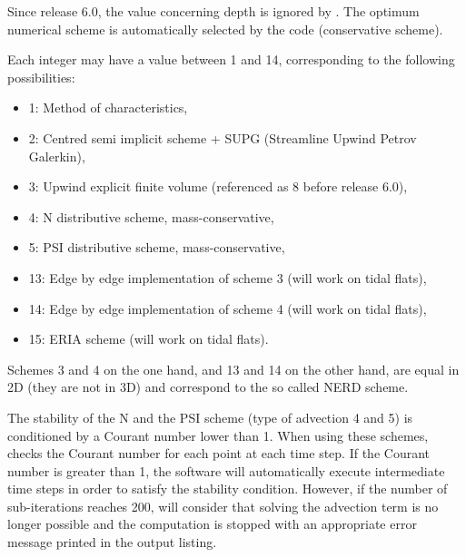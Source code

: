 Since release 6.0, the value concerning depth is ignored by .
The optimum numerical scheme is automatically selected by the code
(conservative scheme).

Each integer may have a value between 1 and 14, corresponding to the following
possibilities:

\begin{itemize}
\item 1: Method of characteristics,

\item 2: Centred semi implicit scheme + SUPG
(Streamline Upwind Petrov Galerkin),

\item 3: Upwind explicit finite volume
(referenced as 8 before release 6.0),

\item 4: N distributive scheme, mass-conservative,

\item 5: PSI distributive scheme, mass-conservative,
%

\item 13: Edge by edge implementation of scheme 3
(will work on tidal flats),

\item 14: Edge by edge implementation of scheme 4
(will work on tidal flats),

\item 15: ERIA scheme (will work on tidal flats).
\end{itemize}

Schemes 3 and 4 on the one hand, and 13 and 14 on the other hand, are equal
in 2D (they are not in 3D) and correspond to the so called NERD scheme.

The stability of the N and the PSI scheme (type of advection 4 and 5)
is conditioned by a Courant number lower than 1.
When using these schemes,  checks the Courant number
for each point at each time step.
If the Courant number is greater than 1, the software will automatically execute
intermediate time steps in order to satisfy the stability condition.
However, if the number of sub-iterations reaches 200,  will consider
that solving the advection term is no longer possible and the computation is
stopped with an appropriate error message printed in the output listing.

